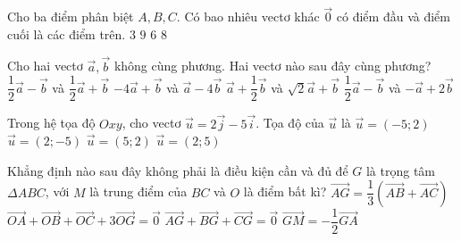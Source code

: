 \begin{ex}%
Cho ba điểm phân biệt $A,B,C$. Có bao nhiêu vectơ khác $\overrightarrow{0}$ có điểm đầu và điểm cuối là các điểm trên.
\choice
{$3$}
{$9$}
{\True $6$}
{$8$}
\end{ex}
\begin{ex}%
Cho hai vectơ $\overrightarrow{a}, \overrightarrow{b}$ không cùng phương. Hai vectơ nào sau đây cùng phương?
\choice
{$\dfrac{1}{2}\overrightarrow{a}-\overrightarrow{b}$ và $\dfrac{1}{2} \overrightarrow{a} +\overrightarrow{b}$}
{$-4\overrightarrow{a}+\overrightarrow{b}$ và $\overrightarrow{a} -4 \overrightarrow{b}$}
{$\overrightarrow{a}+\dfrac{1}{2}\overrightarrow{b}$ và $\sqrt{2}\overrightarrow{a}+\overrightarrow{b}$}
{\True $\dfrac{1}{2}\overrightarrow{a}-\overrightarrow{b}$ và $-\overrightarrow{a}+2\overrightarrow{b}$}
\end{ex}
\begin{ex}%
Trong hệ tọa độ $Oxy$, cho vectơ $\overrightarrow{u}=2\overrightarrow{j}-5\overrightarrow{i}$. Tọa độ của $\overrightarrow{u}$ là
\choice
{\True $\overrightarrow{u}=(-5;2)$}
{$\overrightarrow{u}=(2;-5)$}
{$\overrightarrow{u}=(5;2)$}
{$\overrightarrow{u}=(2;5)$}
\end{ex}
\begin{ex}%
Khẳng định nào sau đây không phải là điều kiện cần và đủ để $G$ là trọng tâm $\Delta ABC$, với $M$ là trung điểm của $BC$ và $O$ là điểm bất kì?
\choice
{$\overrightarrow{AG}=\dfrac{1}{3} \left( \overrightarrow{AB}+\overrightarrow{AC} \right)$}
{\True $ \overrightarrow{OA}+\overrightarrow{OB}+\overrightarrow{OC}+3\overrightarrow{OG}=\overrightarrow{0}$}
{$\overrightarrow{AG}+\overrightarrow{BG}+\overrightarrow{CG}=\overrightarrow{0}$}
{$\overrightarrow{GM}=-\dfrac{1}{2} \overrightarrow{GA}$}
\end{ex}
